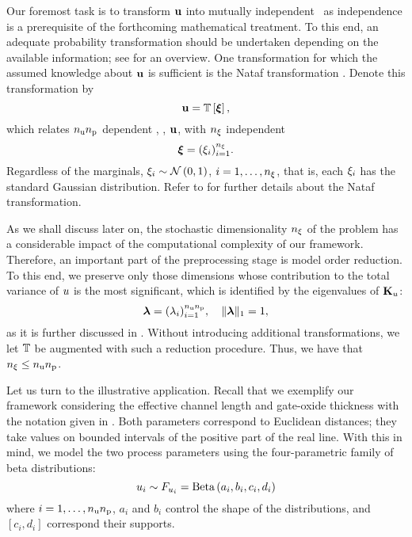 Our foremost task is to transform $\mathbf{u}$ into mutually independent \rvs\ as independence is a prerequisite of the forthcoming mathematical treatment.
To this end, an adequate probability transformation should be undertaken depending on the available information; see \cite{eldred2008} for an overview.
One transformation for which the assumed knowledge about $\mathbf{u}$ is sufficient is the Nataf transformation \cite{li2008}.
Denote this transformation by
\begin{equation} \elab{probability-transformation}
  \vu = \transformation{\vz},
\end{equation}
which relates ${n_\text{u}} {n_\text{p}}$ dependent \rvs, \ie, $\mathbf{u}$, with ${n_\xi}$ independent \rvs
\begin{equation} \elab{independent-random-variables}
  \vz = (\z_i)_{i = 1}^\nvars.
\end{equation}
Regardless of the marginals, $\xi_i \sim \mathcal{N}\left( 0, 1 \right)$, $i = 1, \dots, {n_\xi}$, that is, each $\xi_i$ has the standard Gaussian distribution.
Refer to  for further details about the Nataf transformation.

As we shall discuss later on, the stochastic dimensionality ${n_\xi}$ of the problem has a considerable impact of the computational complexity of our framework.
Therefore, an important part of the preprocessing stage is model order reduction.
To this end, we preserve only those dimensions whose contribution to the total variance of $u$ is the most significant, which is identified by the eigenvalues of $\mathbf{K}_u$:
\begin{equation} \elab{dimension-contribution}
  \dimensionContribution = (\lambda_i)_{i = 1}^{\nparams \nprocs}, \hspace{1em} \norm[1]{\dimensionContribution} = 1,
\end{equation}
as it is further discussed in .
Without introducing additional transformations, we let $\transformation$ be augmented with such a reduction procedure.
Thus, we have that ${n_\xi} \leq {n_\text{u}} {n_\text{p}}$.

Let us turn to the illustrative application.
Recall that we exemplify our framework considering the effective channel length and gate-oxide thickness with the notation given in .
Both parameters correspond to Euclidean distances; they take values on bounded intervals of the positive part of the real line.
With this in mind, we model the two process parameters using the four-parametric family of beta distributions:
\begin{equation*}
  u_i \sim F_{u_i} = \text{Beta}\left( a_i, b_i, c_i, d_i \right)
\end{equation*}
where $i = 1, \dots, {n_\text{u}} {n_\text{p}}$, $a_i$ and $b_i$ control the shape of the distributions, and $[ c_i, d_i ]$ correspond their supports.
